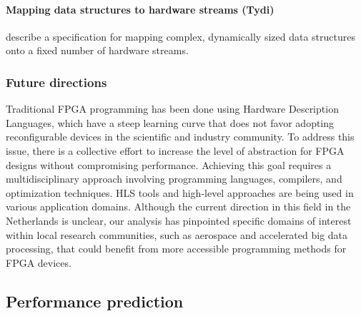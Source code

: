 \paragraph{Mapping data structures to hardware streams (Tydi)}
\citet{Peltenburg2020Tydi:Streams} describe a specification for mapping complex, dynamically sized data structures onto a fixed number of hardware streams.

\subsubsection*{\bf{Future directions}}
Traditional FPGA programming has been done using Hardware Description Languages, which have a steep learning curve that does not favor adopting reconfigurable devices in the scientific and industry community. To address this issue, there is a collective effort to increase the level of abstraction for FPGA designs without compromising performance. Achieving this goal requires a multidisciplinary approach involving programming languages, compilers, and optimization techniques. HLS tools and high-level approaches are being used in various application domains.
Although the current direction in this field in the Netherlands is unclear, our analysis has pinpointed specific domains of interest within local research communities, such as aerospace and accelerated big data processing, that could benefit from more accessible programming methods for FPGA devices.



\subsection{Performance prediction}
\label{perf_pred}

